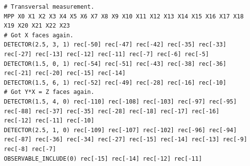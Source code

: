 \documentclass[onecolumn,a4paper,accepted=2022-09-12]{quantumarticle}
\theoremstyle{definition}
\theoremstyle{definition}
\theoremstyle{definition}
\begin{document}
\begin{lstlisting}[style=stimcircuit]
# Transversal measurement.
MPP X0 X1 X2 X3 X4 X5 X6 X7 X8 X9 X10 X11 X12 X13 X14 X15 X16 X17 X18 X19 X20 X21 X22 X23
# Got X faces again.
DETECTOR(2.5, 3, 1) rec[-50] rec[-47] rec[-42] rec[-35] rec[-33] rec[-27] rec[-13] rec[-12] rec[-11] rec[-7] rec[-6] rec[-5]
DETECTOR(1.5, 0, 1) rec[-54] rec[-51] rec[-43] rec[-38] rec[-36] rec[-21] rec[-20] rec[-15] rec[-14]
DETECTOR(1.5, 6, 1) rec[-52] rec[-49] rec[-28] rec[-16] rec[-10]
# Got Y*X = Z faces again.
DETECTOR(1.5, 4, 0) rec[-110] rec[-108] rec[-103] rec[-97] rec[-95] rec[-88] rec[-37] rec[-35] rec[-28] rec[-18] rec[-17] rec[-16] rec[-12] rec[-11] rec[-10]
DETECTOR(2.5, 1, 0) rec[-109] rec[-107] rec[-102] rec[-96] rec[-94] rec[-87] rec[-36] rec[-34] rec[-27] rec[-15] rec[-14] rec[-13] rec[-9] rec[-8] rec[-7]
OBSERVABLE_INCLUDE(0) rec[-15] rec[-14] rec[-12] rec[-11]
\end{lstlisting}
\end{document}
